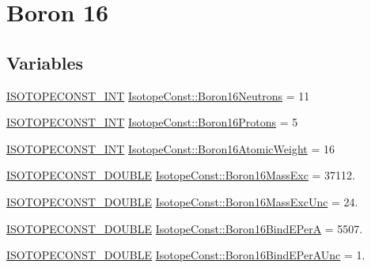 \hypertarget{group___isotope_const-_boron-_b16}{}\section{Boron 16}
\label{group___isotope_const-_boron-_b16}
\subsection*{Variables}
\begin{DoxyCompactItemize}
\item 
\mbox{\hyperlink{group___isotope_const-_macros_ga5f18360b3e99483a35c32d789e62621c}{I\+S\+O\+T\+O\+P\+E\+C\+O\+N\+S\+T\+\_\+\+I\+NT}} \mbox{\hyperlink{group___isotope_const-_boron-_b16_gaf5804672274b093ebe307a1d74aa40c4}{Isotope\+Const\+::\+Boron16\+Neutrons}} = 11
\item 
\mbox{\hyperlink{group___isotope_const-_macros_ga5f18360b3e99483a35c32d789e62621c}{I\+S\+O\+T\+O\+P\+E\+C\+O\+N\+S\+T\+\_\+\+I\+NT}} \mbox{\hyperlink{group___isotope_const-_boron-_b16_ga0834bda630660424a9d14b2c5cbcfcca}{Isotope\+Const\+::\+Boron16\+Protons}} = 5
\item 
\mbox{\hyperlink{group___isotope_const-_macros_ga5f18360b3e99483a35c32d789e62621c}{I\+S\+O\+T\+O\+P\+E\+C\+O\+N\+S\+T\+\_\+\+I\+NT}} \mbox{\hyperlink{group___isotope_const-_boron-_b16_ga562f2307a98c0d322f7ba44e22523a9d}{Isotope\+Const\+::\+Boron16\+Atomic\+Weight}} = 16
\item 
\mbox{\hyperlink{group___isotope_const-_macros_ga8f45a7272ce02c0b4c65c44636ed719a}{I\+S\+O\+T\+O\+P\+E\+C\+O\+N\+S\+T\+\_\+\+D\+O\+U\+B\+LE}} \mbox{\hyperlink{group___isotope_const-_boron-_b16_ga3ca7cb67a96b4053f72eb64cf04ef277}{Isotope\+Const\+::\+Boron16\+Mass\+Exc}} = 37112.
\item 
\mbox{\hyperlink{group___isotope_const-_macros_ga8f45a7272ce02c0b4c65c44636ed719a}{I\+S\+O\+T\+O\+P\+E\+C\+O\+N\+S\+T\+\_\+\+D\+O\+U\+B\+LE}} \mbox{\hyperlink{group___isotope_const-_boron-_b16_ga5f0e1f182d3d4f0c0a89ac97b84f3a2c}{Isotope\+Const\+::\+Boron16\+Mass\+Exc\+Unc}} = 24.
\item 
\mbox{\hyperlink{group___isotope_const-_macros_ga8f45a7272ce02c0b4c65c44636ed719a}{I\+S\+O\+T\+O\+P\+E\+C\+O\+N\+S\+T\+\_\+\+D\+O\+U\+B\+LE}} \mbox{\hyperlink{group___isotope_const-_boron-_b16_gae5d792a500660e8d3654af53016491c7}{Isotope\+Const\+::\+Boron16\+Bind\+E\+PerA}} = 5507.
\item 
\mbox{\hyperlink{group___isotope_const-_macros_ga8f45a7272ce02c0b4c65c44636ed719a}{I\+S\+O\+T\+O\+P\+E\+C\+O\+N\+S\+T\+\_\+\+D\+O\+U\+B\+LE}} \mbox{\hyperlink{group___isotope_const-_boron-_b16_ga1195aca9a018129753b78f4921deb437}{Isotope\+Const\+::\+Boron16\+Bind\+E\+Per\+A\+Unc}} = 1.

\end{DoxyCompactItemize}
